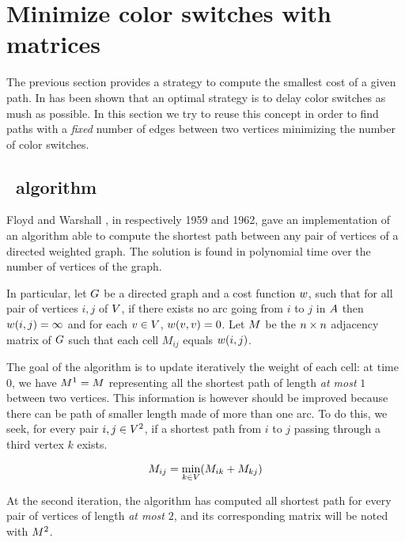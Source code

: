\section{Minimize color switches with matrices}

The previous section provides a strategy to compute the smallest cost of a given path. In has been shown that an optimal strategy is to delay color switches as mush as possible. In this section we try to reuse this concept in order to find paths with a \textit{fixed} number of edges between two vertices minimizing the number of color switches.

\subsection{\FW\ algorithm}
\label{sec:fwalgo}

Floyd \cite[]{floyd} and Warshall \cite{warshall}, in respectively 1959 and 1962, gave an implementation \cite[]{floydalgo} of an algorithm able to compute the shortest path between any pair of vertices of a directed weighted graph. The solution is found in polynomial time over the number of vertices of the graph.

In particular, let $G$ be a directed graph and a cost function $w$, such that for all pair of vertices $i,j$ of $V$, if there exists no arc going from $i$ to $j$ in $A$ then $w(i,j) = \infty$ and for each $v \in V$, $w(v, v) = 0$. Let $M$ be the $n \times n$ adjacency matrix of $G$ such that each cell $M_{ij}$ equals $w(i, j)$.

The goal of the algorithm is to update iteratively the weight of each cell: at time $0$, we have $M^1 = M$ representing all the shortest path of length \textit{at most} $1$ between two vertices. This information is however should be improved because there can be path of smaller length made of more than one arc. To do this, we seek, for every pair $i, j \in V^2$, if a shortest path from $i$ to $j$ passing through a third vertex $k$ exists.

\begin{equation}
  \label{eq:cellc}
  M_{ij} = \min_{k \in V} (M_{ik} + M_{kj})
\end{equation}

At the second iteration, the algorithm has computed all shortest path for every pair of vertices of length \textit{at most} $2$, and its corresponding matrix will be noted with $M^2$.

